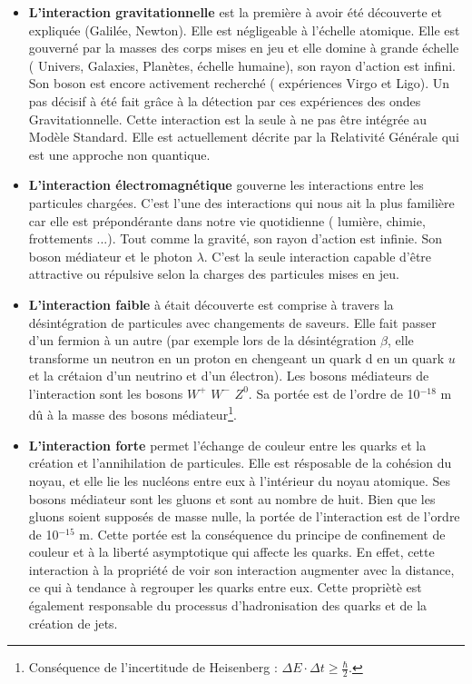 \begin{itemize}
\item \textbf{L'interaction gravitationnelle} est la première à avoir été découverte et expliquée (Galilée, Newton). Elle est négligeable à l'échelle atomique. Elle est gouverné par la masses des corps mises en jeu et elle domine à grande échelle ( Univers, Galaxies, Planètes, échelle humaine), son rayon d'action est infini. Son boson est encore activement recherché ( expériences Virgo et Ligo). Un pas décisif à été fait grâce à la détection par ces expériences des ondes Gravitationnelle. Cette interaction est la seule à ne pas être intégrée au Modèle Standard. Elle est actuellement décrite par la Relativité Générale qui est une approche non quantique.
\newline
\item \textbf{L'interaction électromagnétique} gouverne les interactions entre les particules chargées. C'est l'une des interactions qui nous ait la plus familière car elle est prépondérante dans notre vie quotidienne ( lumière, chimie, frottements ...). Tout comme la gravité, son rayon d'action est infinie. Son boson médiateur et le photon $\lambda$. C'est la seule interaction capable d'être attractive ou répulsive selon la charges des particules mises en jeu.
\newline
\item \textbf{L'interaction faible} à était découverte est comprise à travers la désintégration de particules avec changements de saveurs. Elle fait passer d'un fermion à un autre (par exemple lors de la désintégration $\beta$, elle transforme un neutron en un proton en chengeant un quark d en un quark $u$ et la crétaion d'un neutrino et d'un électron). Les bosons médiateurs de l'interaction sont les bosons $W^{+}$ $W^{-}$ $Z^{0}$. Sa portée est de l'ordre de 10$^{-18}$ m dû à la masse des bosons médiateur\footnote{Conséquence de l'incertitude de Heisenberg : $\Delta E \cdot \Delta t \geq \frac{\hbar}{2}$.}.
\newline
\item \textbf{L'interaction forte} permet l'échange de couleur entre les quarks et la création et l'annihilation de particules. Elle est résposable de la cohésion du noyau, et elle lie les nucléons entre eux à l'intérieur du noyau atomique. Ses bosons médiateur sont les gluons et sont au nombre de huit. Bien que les gluons soient supposés de masse nulle, la portée de l'interaction est de l'ordre de 10$^{-15}$ m. Cette portée est la conséquence du principe de confinement de couleur et à la liberté asymptotique qui affecte les quarks. En effet, cette interaction à la propriété de voir son interaction augmenter avec la distance, ce qui à tendance à regrouper les quarks entre eux. Cette propriètè est également responsable du processus d'hadronisation des quarks et de la création de jets.
\end{itemize}






 
    
  
 
 

